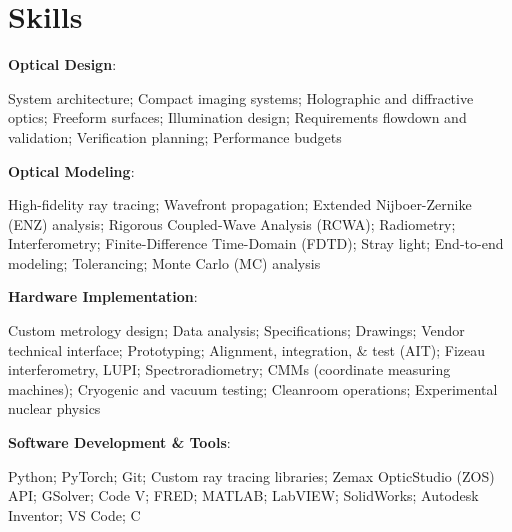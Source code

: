 \documentclass[letterpaper,11pt]{article}
\begin{document}
\section{Skills}
\begin{itemize}[leftmargin=0.15in, label={}]
    \small{
        \item\begin{minipage}[t]{\linewidth}
            \textbf{Optical Design}: \hangindent=25pt  \raggedright System architecture; Compact imaging systems; Holographic and diffractive optics; Freeform surfaces; Illumination design; Requirements flowdown and validation; Verification planning; Performance budgets
        \end{minipage}
        \item\begin{minipage}[t]{\linewidth}
            \textbf{Optical Modeling}: \hangindent=25pt  \raggedright High-fidelity ray tracing; Wavefront propagation; Extended Nijboer-Zernike (ENZ) analysis; Rigorous Coupled-Wave Analysis (RCWA); Radiometry; Interferometry; Finite-Difference Time-Domain (FDTD); Stray light; End-to-end modeling; Tolerancing; Monte Carlo (MC) analysis
        \end{minipage}
        \item\begin{minipage}[t]{\linewidth}
            \textbf{Hardware Implementation}: \hangindent=25pt  \raggedright Custom metrology design; Data analysis; Specifications; Drawings; Vendor technical interface; Prototyping; Alignment, integration, \& test (AIT); Fizeau interferometry, LUPI; Spectroradiometry; CMMs (coordinate measuring machines); Cryogenic and vacuum testing; Cleanroom operations; Experimental nuclear physics
        \end{minipage}
        \item\begin{minipage}[t]{\linewidth}
            \textbf{Software Development \& Tools}: \hangindent=25pt  \raggedright Python; PyTorch; Git; Custom ray tracing libraries; Zemax OpticStudio (ZOS) API; GSolver; Code V; FRED; MATLAB; LabVIEW; SolidWorks; Autodesk Inventor; VS Code; C
        \end{minipage}
    }
\end{itemize}


\end{document}
